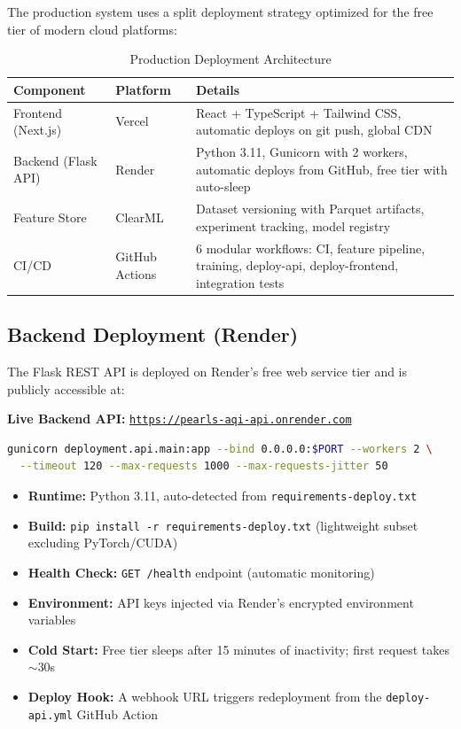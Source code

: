 \documentclass[12pt, a4paper, oneside]{article}
\begin{document}
The production system uses a split deployment strategy optimized for the free tier of modern cloud platforms:

\begin{table}[H]
\centering
\caption{Production Deployment Architecture}
\label{tab:deploy_arch}
\begin{tabularx}{\textwidth}{l l X}
\toprule
\textbf{Component} & \textbf{Platform} & \textbf{Details} \\
\midrule
Frontend (Next.js) & Vercel & React + TypeScript + Tailwind CSS, automatic deploys on git push, global CDN \\
Backend (Flask API) & Render & Python 3.11, Gunicorn with 2 workers, automatic deploys from GitHub, free tier with auto-sleep \\
Feature Store & ClearML & Dataset versioning with Parquet artifacts, experiment tracking, model registry \\
CI/CD & GitHub Actions & 6 modular workflows: CI, feature pipeline, training, deploy-api, deploy-frontend, integration tests \\
\bottomrule
\end{tabularx}
\end{table}

\subsection{Backend Deployment (Render)}

The Flask REST API is deployed on Render's free web service tier and is publicly accessible at:

\vspace{0.2cm}
\begin{center}
\textbf{Live Backend API:} \href{https://pearls-aqi-api.onrender.com}{\texttt{https://pearls-aqi-api.onrender.com}}
\end{center}
\vspace{0.2cm}

\begin{lstlisting}[language=bash, caption={Render start command}]
gunicorn deployment.api.main:app --bind 0.0.0.0:$PORT --workers 2 \
  --timeout 120 --max-requests 1000 --max-requests-jitter 50
\end{lstlisting}

\begin{itemize}
    \item \textbf{Runtime:} Python 3.11, auto-detected from \texttt{requirements-deploy.txt}
    \item \textbf{Build:} \texttt{pip install -r requirements-deploy.txt} (lightweight subset excluding PyTorch/CUDA)
    \item \textbf{Health Check:} \texttt{GET /health} endpoint (automatic monitoring)
    \item \textbf{Environment:} API keys injected via Render's encrypted environment variables
    \item \textbf{Cold Start:} Free tier sleeps after 15 minutes of inactivity; first request takes $\sim$30s
    \item \textbf{Deploy Hook:} A webhook URL triggers redeployment from the \texttt{deploy-api.yml} GitHub Action
\end{itemize}
\end{document}
